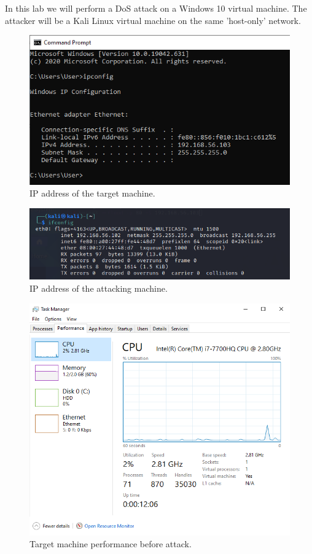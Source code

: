 In this lab we will perform a DoS attack on a Windows 10 virtual machine.
The attacker will be a Kali Linux virtual machine on the same 'host-only' network.

\begin{figure}[H]
    \centering
    \includegraphics[width=\linewidth]{figures/target_ip.png}
    \caption{IP address of the target machine.}
    \label{fig:target-ip}
\end{figure}

\begin{figure}[H]
    \centering
    \includegraphics[width=\linewidth]{figures/attacker_ip.png}
    \caption{IP address of the attacking machine.}
    \label{fig:attack-ip}
\end{figure}

\begin{figure}[H]
    \centering
    \includegraphics[]{figures/before_performance.png}
    \caption{Target machine performance before attack.}
    \label{fig:performance-before}
\end{figure}

